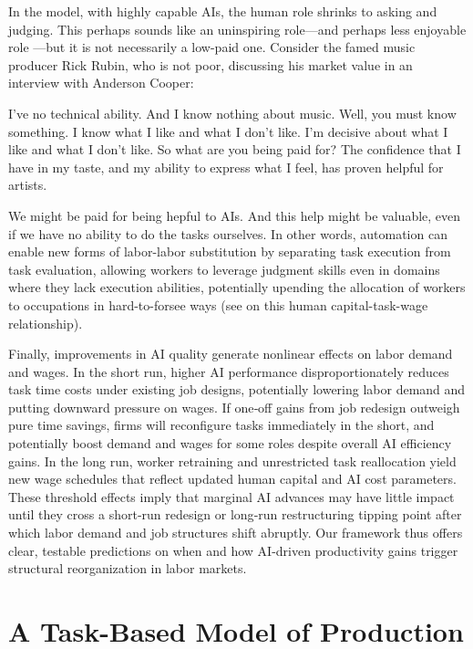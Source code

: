 \documentclass{article}
\theoremstyle{plain}
\theoremstyle{plain}
\begin{document}
In the model, with highly capable AIs, the human role shrinks to asking and judging. 
This perhaps sounds like an uninspiring role---and perhaps less enjoyable role \citep{toner2024artificial}---but it is not necessarily a low-paid one. 
Consider the famed music producer Rick Rubin, who is not poor, discussing his market value in an interview with Anderson Cooper:
\begin{dialogue}
     I've no technical ability. And I know nothing about music.
     Well, you must know something.
     I know what I like and what I don't like. I'm decisive about what I like and what I don't like.
     So what are you being paid for?
     The confidence that I have in my taste, and my ability to express what I feel, has proven helpful for artists.
\end{dialogue}
We might be paid for being hepful to AIs.
And this help might be valuable, even if we have no ability to do the tasks ourselves.
In other words, automation can enable new forms of labor-labor substitution by separating task execution from task evaluation, allowing workers to leverage judgment skills even in domains where they lack execution abilities, potentially upending the allocation of workers to occupations in hard-to-forsee ways (see \cite{autor2013putting} on this human capital-task-wage relationship).

Finally, improvements in AI quality generate nonlinear effects on labor demand and wages.
In the short run, higher AI performance disproportionately reduces task time costs under existing job designs, potentially lowering labor demand and putting downward pressure on wages.  
If one‐off gains from job redesign outweigh pure time savings, firms will reconfigure tasks immediately in the short, and potentially boost demand and wages for some roles despite overall AI efficiency gains.  
In the long run, worker retraining and unrestricted task reallocation yield new wage schedules that reflect updated human capital and AI cost parameters.  
These threshold effects imply that marginal AI advances may have little impact until they cross a short‐run redesign or long‐run restructuring tipping point after which labor demand and job structures shift abruptly.  
Our framework thus offers clear, testable predictions on when and how AI-driven productivity gains trigger structural reorganization in labor markets.  




\section{A Task-Based Model of Production}
\label{sec:taskbased_prod}
\end{document}
